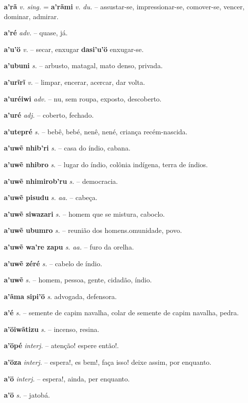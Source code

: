 \textbf{a'rã} \textit{v. sing.} = \textbf{a'rãmi} \textit{v. du.} -- assustar-se, impressionar-se, comover-se, vencer, dominar, admirar.

\textbf{a'ré} \textit{adv.} -- quase, já.

\textbf{a'u'ö} \textit{v.} -- secar, enxugar  \textbf{dasi'u'ö} enxugar-se.

\textbf{a'ubuni} \textit{s.} -- arbusto, matagal, mato denso, privada.

\textbf{a'urĩrĩ} \textit{v.} -- limpar, encerar, acercar, dar volta.

\textbf{a'uréiwi} \textit{adv.} -- nu, sem roupa, exposto, descoberto.

\textbf{a'uré} \textit{adj.} -- coberto, fechado.

\textbf{a'utepré} \textit{s.} -- bebê, bebé, nenê, nené, criança recém-nascida.

\textbf{a'uwẽ nhib'ri} \textit{s.} -- casa do índio, cabana.

\textbf{a'uwẽ nhibro} \textit{s.} -- lugar do índio, colônia indígena, terra de índios.

\textbf{a'uwẽ nhimirob'ru} \textit{s.} -- democracia.

\textbf{a'uwẽ pisudu} \textit{s. aa.} -- cabeça.

\textbf{a'uwẽ siwazari} \textit{s.} -- homem que se mistura, caboclo.

\textbf{a'uwẽ ubumro} \textit{s.} -- reunião dos homens.omunidade, povo.

\textbf{a'uwẽ wa're zapu} \textit{s. aa.} -- furo da orelha.

\textbf{a'uwẽ zéré} \textit{s.} -- cabelo de índio.

\textbf{a'uwẽ} \textit{s.} -- homem, pessoa, gente, cidadão, índio.

\textbf{a'ãma sipi'ö} \textit{s.} advogada, defensora.

\textbf{a'é} \textit{s.} -- semente de capim navalha, colar de semente de capim navalha, pedra.

\textbf{a'öiwãtizu} \textit{s.} -- incenso, resina.

\textbf{a'öpé} \textit{interj.} -- atenção! espere então!.

\textbf{a'öza} \textit{interj.} -- espera!, es bem!, faça isso! deixe assim, por enquanto.

\textbf{a'ö} \textit{interj.} -- espera!, ainda, per enquanto.

\textbf{a'ö} \textit{s.} -- jatobá.

